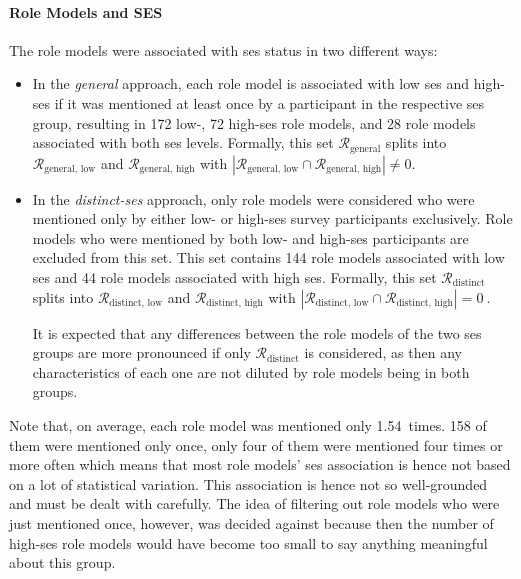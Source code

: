 \paragraph{Role Models and SES}
The role models were associated with \gls{ses} status in two different ways:
\begin{itemize}
    \item In the \textit{general} approach, each role model is associated with low \gls{ses} and high-\gls{ses} if it was mentioned at least once by a participant in the respective \gls{ses} group, resulting in \SI{172}{} low-, \SI{72}{} high-\gls{ses} role models, and \SI{28}{} role models associated with both \gls{ses} levels. Formally, this set $\mathcal{R}_\text{general}$ splits into $\mathcal{R}_\text{general, low}$ and $\mathcal{R}_\text{general, high}$ with $\left|\mathcal{R}_\text{general, low} \cap \mathcal{R}_\text{general, high}\right| \neq 0$.

    \item In the \textit{distinct-\gls{ses}} approach, only role models were considered who were mentioned only by either low- or high-\gls{ses} survey participants exclusively. Role models who were mentioned by both low- and high-\gls{ses} participants are excluded from this set. This set contains \SI{144}{} role models associated with low \gls{ses} and \SI{44}{} role models associated with high \gls{ses}. Formally, this set $\mathcal{R}_\text{distinct}$ splits into $\mathcal{R}_\text{distinct, low}$ and $\mathcal{R}_\text{distinct, high}$ with $\left|\mathcal{R}_\text{distinct, low} \cap \mathcal{R}_\text{distinct, high}\right| = \SI{0}{}$.
    
    It is expected that any differences between the role models of the two \gls{ses} groups are more pronounced if only $\mathcal{R}_\text{distinct}$ is considered, as then any characteristics of each one are not diluted by role models being in both groups.
\end{itemize}

Note that, on average, each role model was mentioned only \SI{1.54}{times}. \SI{158}{} of them were mentioned only once, only four of them were mentioned four times or more often which means that most role models' \gls{ses} association is hence not based on a lot of statistical variation. This association is hence not so well-grounded and must be dealt with carefully. The idea of filtering out role models who were just mentioned once, however, was decided against because then the number of high-\gls{ses} role models would have become too small to say anything meaningful about this group.

